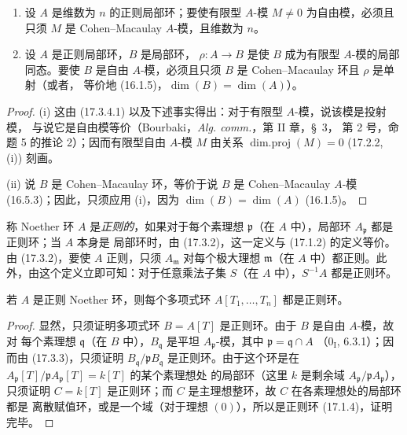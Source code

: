 
\begin{corollary}[17.3.5]
\label{0.17.3.5-fr}
\begin{enumerate}
  \item[\rm(i)] 设 $A$ 是维数为 $n$ 的正则局部环；要使有限型
  $A$-模 $M\neq0$ 为自由模，必须且只须 $M$ 是 Cohen--Macaulay
  $A$-模，且维数为 $n$。
  \item[\rm(ii)] 设 $A$ 是正则局部环，$B$ 是局部环，
  $\rho:A\to B$ 是使 $B$ 成为有限型 $A$-模的局部同态。要使 $B$ 是自由
  $A$-模，必须且只须 $B$ 是 Cohen--Macaulay 环且 $\rho$ 是单射（或者，
  等价地 (16.1.5)，$\dim(B)=\dim(A)$）。
\end{enumerate}
\end{corollary}

\begin{proof}
(i) 这由 (17.3.4.1) 以及下述事实得出：对于有限型 $A$-模，说该模是投射模，
与说它是自由模等价（Bourbaki，\emph{Alg. comm.}，第 II 章，\S~3，
第 2 号，命题 5 的推论 2）；因而有限型自由 $A$-模 $M$
由关系 $\operatorname{dim.proj}(M)=0$ (17.2.2, (i)) 刻画。

(ii) 说 $B$ 是 Cohen--Macaulay 环，等价于说 $B$ 是 Cohen--Macaulay
$A$-模 (16.5.3)；因此，只须应用 (i)，因为 $\dim(B)=\dim(A)$ (16.1.5)。
\end{proof}

\begin{env}[17.3.6]
\label{0.17.3.6-fr}
称 Noether 环 $A$ 是\emph{正则的}，如果对于每个素理想 $\mathfrak{p}$（在
$A$ 中），局部环 $A_{\mathfrak{p}}$ 都是正则环；当 $A$ 本身是
局部环时，由 (17.3.2)，这一定义与 (17.1.2) 的定义等价。由 (17.3.2)，要使
$A$ 正则，只须 $A_{\mathfrak{m}}$ 对每个极大理想 $\mathfrak{m}$（在
$A$ 中）都正则。此外，由这个定义立即可知：对于任意乘法子集
$S$（在 $A$ 中），$S^{-1}A$ 都是正则环。
\end{env}

\begin{proposition}[17.3.7]
\label{0.17.3.7-fr}
若 $A$ 是正则 Noether 环，则每个多项式环 $A[T_1,\ldots,T_n]$ 都是正则环。
\end{proposition}

\begin{proof}
显然，只须证明多项式环 $B=A[T]$ 是正则环。由于 $B$ 是自由 $A$-模，故对
每个素理想 $\mathfrak{q}$（在 $B$ 中），$B_{\mathfrak{q}}$ 是平坦
$A_{\mathfrak{p}}$-模，其中 $\mathfrak{p}=\mathfrak{q}\cap A$
（$0_{\mathrm I}$, 6.3.1）；因而由 (17.3.3)，只须证明
$B_{\mathfrak{q}}/\mathfrak{p}B_{\mathfrak{q}}$ 是正则环。由于这个环是在
$A_{\mathfrak{p}}[T]/\mathfrak{p}A_{\mathfrak{p}}[T]=k[T]$ 的某个素理想处
的局部环（这里 $k$ 是剩余域
$A_{\mathfrak{p}}/\mathfrak{p}A_{\mathfrak{p}}$），只须证明
$C=k[T]$ 是正则环；而 $C$ 是主理想整环，故 $C$ 在各素理想处的局部环都是
离散赋值环，或是一个域（对于理想 $(0)$），所以是正则环 (17.1.4)，证明完毕。
\end{proof}

